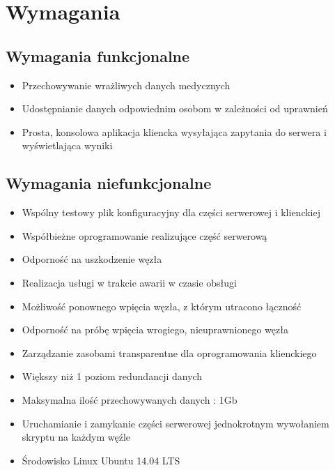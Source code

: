 \chapter{Wymagania}



\section{Wymagania funkcjonalne}

\begin{itemize}
\item Przechowywanie wrażliwych danych medycznych
\item Udostępnianie danych odpowiednim osobom w zależności od uprawnień
\item Prosta, konsolowa aplikacja kliencka wysyłająca zapytania do serwera i wyświetlająca wyniki
\end{itemize}

\section{Wymagania niefunkcjonalne}

\begin{itemize}
\item Wspólny testowy plik konfiguracyjny dla części serwerowej i klienckiej
\item Współbieżne oprogramowanie realizujące część serwerową
\item Odporność na uszkodzenie węzła
\item Realizacja usługi w trakcie awarii w czasie obsługi
\item Możliwość ponownego wpięcia węzła, z którym utracono łączność
\item Odporność na próbę wpięcia wrogiego, nieuprawnionego węzła
\item Zarządzanie zasobami transparentne dla oprogramowania klienckiego
\item Większy niż 1 poziom redundancji danych
\item Maksymalna ilość przechowywanych danych : 1Gb
\item Uruchamianie i zamykanie części serwerowej jednokrotnym wywołaniem skryptu na każdym węźle
\item Środowisko Linux Ubuntu 14.04 LTS
\end{itemize}
